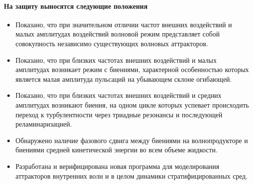 \documentclass[utf8x]{G7-32} %
\begin{document}
\paragraph{На защиту выносятся следующие положения}
\begin{itemize}


  \item Показано, что при значительном отличии частот внешних воздействий и малых амплитудах воздействий волновой режим представляет собой совокупность независимо существующих волновых аттракторов.

  \item Показано, что при близких частотах внешних воздействий и малых амплитудах возникает режим с биениями, характерной особенностью которых является малая амплитуда пульсаций на убывающем склоне огибающей.

  \item Показано, что при близких частотах внешних воздействий и средних амплитудах возникают биения, на одном цикле которых успевает происходить переход к турбулентности через триадные резонансы и последующей реламинаризацией.
    
  \item Обнаружено наличие фазового сдвига между биениями на волнопродукторе и биениями средней кинетической энергии во всем объеме жидкости.
    

  \item Разработана и верифицирована новая программа для моделирования аттракторов внутренних волн и в целом динамики стратифицированных сред.
    

    
    
    
\end{itemize}
\end{document}
